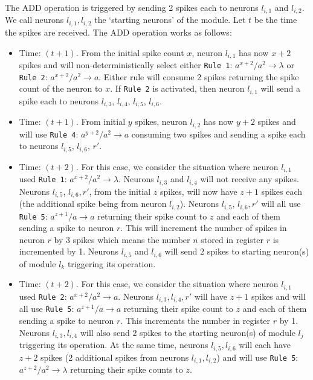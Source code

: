\documentclass[smallextended]{svjour3}
\begin{document}
The ADD operation is triggered by sending 2 spikes each to neurons $l_{i,1}$ and ${l_{i,2}}$. We call neurons $l_{i,1}, l_{i,2}$ the `starting neurons'
of the module. Let $t$ be the time the spikes are received. The ADD operation works as follows:
\begin{itemize}
   \item Time: $(t+1)$. From the initial spike count $x$, neuron $l_{i,1}$ has now $x+2$ spikes and will non-deterministically select either 
                        \texttt{Rule 1}: $a^{x+2}/a^2 \rightarrow \lambda$ or \texttt{Rule 2}: $a^{x+2}/a^2 \rightarrow a$. Either rule will consume
                        2 spikes returning the spike count of the neuron to $x$. If \texttt{Rule 2} is activated, then neuron $l_{i,1}$ will send a 
                        spike each to neurons $l_{i,3}$, $l_{i,4}$, $l_{i,5}$, $l_{i,6}$.
   \item Time: $(t+1)$. From initial $y$ spikes, neuron $l_{i,2}$ has now $y+2$ spikes and will use \texttt{Rule 4}: $a^{y+2}/a^2 \rightarrow a$ 
                        consuming two spikes and sending a spike each to neurons $l_{i,5}$, $l_{i,6}$, $r'$.

   \item Time: $(t+2)$. For this case, we consider the situation where neuron $l_{i,1}$ used \texttt{Rule 1}: $a^{x+2}/a^2 \rightarrow \lambda$. 
                        Neurons $l_{i,3}$ and $l_{i,4}$ will not receive any spikes. Neurons $l_{i,5}$, $l_{i,6}, r'$, from the initial $z$ spikes, 
                        will now have $z+1$ spikes each (the additional spike being from neuron $l_{i,2}$). Neurons $l_{i,5}$, $l_{i,6}, r'$ will all
                        use \texttt{Rule 5}: $a^{z+1}/a \rightarrow a$ returning their spike count to $z$ and each of them sending a spike to neuron 
                        $r$. This will increment the number of spikes in neuron $r$ by 3 spikes which means the number $n$ stored in register $r$ is 
                        incremented by 1. Neurons $l_{i,5}$ and $l_{i,6}$ will send $2$ spikes to starting neuron(s) of module $l_k$ triggering its 
                        operation.
   \item Time: $(t+2)$. For this case, we consider the situation where neuron $l_{i,1}$ used \texttt{Rule 2}: $a^{x+2}/a^2 \rightarrow a $.
                        Neurons $l_{i,3}, l_{i,4}, r'$ will have $z+1$ spikes and will all use  \texttt{Rule 5}: $a^{z+1}/a \rightarrow a$ returning 
                        their spike count to $z$ and each of them sending a spike to neuron $r$. This increments the number in register $r$ by 1.
                        Neurons $l_{i,3}, l_{i,4}$ will also send 2 spikes to the starting neuron(s) of module $l_j$ triggering its operation. At the same
                        time, neurons $l_{i,5}, l_{i,6}$ will each have $z+2$ spikes (2 additional spikes from neurons $l_{i,1}, l_{i,2}$) and will 
                        use \texttt{Rule 5}: $a^{z+2}/a^2 \rightarrow \lambda$ returning their spike counts to $z$.
\end{itemize}
\end{document}
